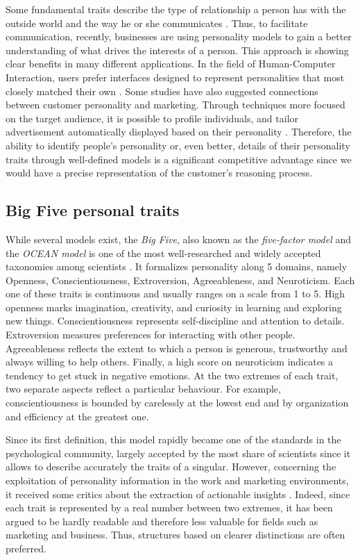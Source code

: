 Some fundamental traits describe the type of relationship a person has with the outside world and the way he or she communicates \cite{lima2016predicting}.
Thus, to facilitate communication, recently, businesses are using personality models to gain a better understanding of what drives the interests of a person.
This approach is showing clear benefits in many different applications.
In the field of Human-Computer Interaction, users prefer interfaces designed to represent personalities that most closely matched their own \cite{nass2000does}.
Some studies have also suggested connections between customer personality and marketing. Through techniques more focused on the target audience, it is possible to profile individuals, and tailor advertisement automatically displayed based on their personality \cite{bachrach2012personality}.
Therefore, the ability to identify people's personality or, even better, details of their personality traits through well-defined models is a significant competitive advantage since
we would have a precise representation of the customer's reasoning process.

\subsection{Big Five personal traits}
While several models exist, the \textit{Big Five}, also known as the \textit{five-factor model} and the \textit{OCEAN model} is one of the most well-researched and widely accepted taxonomies among scientists \cite{mccrae1992introduction, mccrae1987validation}.
It formalizes personality along 5 domains, namely Openness, Conscientiousness, Extroversion, Agreeableness, and Neuroticism. Each one of these traits is continuous and usually ranges on a scale from 1 to 5.
High openness marks imagination, creativity, and curiosity in learning and exploring new things. Conscientiousness represents self-discipline and attention to details.
Extroversion measures preferences for interacting with other people. Agreeableness reflects the extent to which a person is generous, trustworthy and always willing to help others.
Finally, a high score on neuroticism indicates a tendency to get stuck in negative emotions.
At the two extremes of each trait, two separate aspects reflect a particular behaviour. 
For example, conscientiousness is bounded by carelessly at the lowest end and by organization and efficiency at the greatest one.

Since its first definition, this model rapidly became one of the standards in the psychological community, largely accepted by the most share of scientists since it allows to describe accurately the traits of a singular.
However, concerning the exploitation of personality information in the work and marketing environments, it received some critics about the extraction of actionable insights \cite{hough2003use, patton2014career}.
Indeed, since each trait is represented by a real number between two extremes, it has been argued to be hardly readable and therefore less valuable for fields such as marketing and business.
Thus, structures based on clearer distinctions are often preferred.

